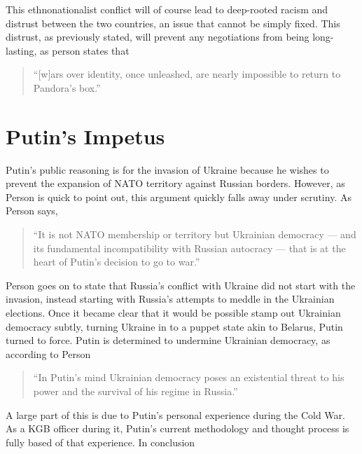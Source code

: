 \documentclass{article}
\begin{document}
        This ethnonationalist conflict will of course lead to deep-rooted racism and distrust between the two countries, an issue that cannot be simply fixed. This distrust, as previously stated, will prevent any negotiations from being long-lasting, as person states that

        \begin{quote}
            ``[w]ars over identity, once unleashed, are nearly impossible to return to Pandora’s box.''
        \end{quote}

\section{Putin's Impetus}

    Putin's public reasoning is for the invasion of Ukraine because he wishes to prevent the expansion of NATO territory against Russian borders. However, as Person is quick to point out, this argument quickly falls away under scrutiny. As Person says,

    \begin{quote}
        ``It is not NATO membership or territory but Ukrainian democracy — and its fundamental incompatibility with Russian autocracy — that is at the heart of Putin's decision to go to war.''
    \end{quote}

    Person goes on to state that Russia's conflict with Ukraine did not start with the invasion, instead starting with Russia's attempts to meddle in the Ukrainian elections. Once it became clear that it would be possible stamp out Ukrainian democracy subtly, turning Ukraine in to a puppet state akin to Belarus, Putin turned to force. Putin is determined to undermine Ukrainian democracy, as according to Person

    \begin{quote}
        ``In Putin's mind Ukrainian democracy poses an existential threat to his power and the survival of his regime in Russia.''
    \end{quote}

    A large part of this is due to Putin's personal experience during the Cold War. As a KGB officer during it, Putin's current methodology and thought process is fully based of that experience. In conclusion 
\end{document}
